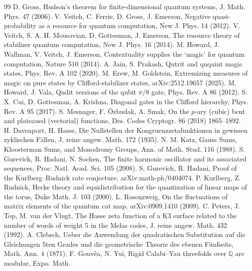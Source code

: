 \documentclass[11pt]{article}
\theoremstyle{remark}
\begin{document}
\begin{thebibliography}{99}
 D. Gross, Hudson's theorem for finite-dimensional quantum systems, J. Math. Phys. 47 (2006).
 V. Veitch, C. Ferrie, D. Gross, J. Emerson, Negative quasi-probability as a resource for quantum
computation, New J. Phys. 14 (2012).
 V. Veitch, S. A. H. Mousavian, D. Gottesman, J. Emerson, The resource theory of stabilizer
quantum computation, New J. Phys. 16 (2014).
 M. Howard, J. Wallman, V. Veitch, J. Emerson, Contextuality supplies the `magic' for quantum
computation, Nature 510 (2014).
 A. Jain, S. Prakash, Qutrit and ququint magic states, Phys. Rev. A 102 (2020).
 M. Erew, M. Goldstein, Extremizing measures of magic on pure states by Clifford-stabilizer states,
arXiv:2512.19657 (2025).
 M. Howard, J. Vala, Qudit versions of the qubit $\pi/8$ gate, Phys. Rev. A 86 (2012).
 S. X. Cui, D. Gottesman, A. Krishna, Diagonal gates in the Clifford hierarchy, Phys. Rev. A 95
(2017).
 S. Mesnager, F. \"Ozbudak, A. S{\i}nak, On the $p$-ary (cubic) bent and plateaued (vectorial)
functions, Des. Codes Cryptogr. 86 (2018) 1865--1892.
 H. Davenport, H. Hasse, Die Nullstellen der Kongruenzzetafunktionen in gewissen zyklischen
F\"allen, J. reine angew. Math. 172 (1935).
 N. M. Katz, Gauss Sums, Kloosterman Sums, and Monodromy Groups, Ann. of Math. Stud. 116 (1988).
 S. Gurevich, R. Hadani, N. Sochen, The finite harmonic oscillator and its associated sequences,
Proc. Natl. Acad. Sci. 105 (2008).
 S. Gurevich, R. Hadani, Proof of the Kurlberg--Rudnick rate conjecture,
arXiv:math-ph/0404074.
 P. Kurlberg, Z. Rudnick, Hecke theory and equidistribution for the quantization of
linear maps of the torus, Duke Math. J. 103 (2000).
 L. Rosenzweig, On the fluctuations of matrix elements of the quantum cat map,
arXiv:0909.1410 (2009).
 C. Peters, J. Top, M. van der Vlugt, The Hasse zeta function of a K3 surface related to the
number of words of weight 5 in the Melas codes, J. reine angew. Math. 432 (1992).
 A. Clebsch, Ueber die Anwendung der quadratischen Substitution auf die Gleichungen 5ten Grades
und die geometrische Theorie des ebenen F\"unfseits, Math. Ann. 4 (1871).
 F. Gouv\^ea, N. Yui, Rigid Calabi--Yau threefolds over $\mathbb Q$ are modular, Expo. Math.

\end{thebibliography}
\end{document}
